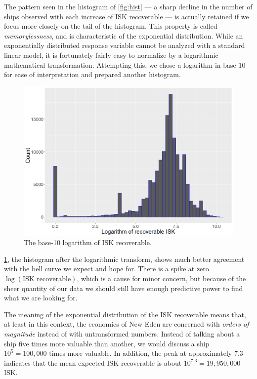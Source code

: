 \documentclass[letterpaper,12pt,article]{memoir}
\begin{document}
The pattern seen in the histogram of \cref{fig:hist} --- a sharp decline in the
number of ships observed with each increase of ISK recoverable --- is actually
retained if we focus more closely on the tail of the histogram. This property is
called \textit{memorylessness}, and is characteristic of the exponential 
distribution. While an exponentially distributed response variable cannot be
analyzed with a standard linear model, it is fortunately fairly easy to normalize
by a logarithmic mathematical transformation. Attempting this, we chose a logarithm
in base 10 for ease of interpretation and prepared another histogram.

\begin{figure}[ht]
    \centering
    \includegraphics[width=4.5in]{Hist_LogRecoverable.png}
    \caption{The base-10 logarithm of ISK recoverable.}
    \label{fig:loghist}
\end{figure}

\cref{fig:loghist}, the histogram after the logarithmic transform, shows much
better agreement with the bell curve we expect and hope for. There is a spike at
zero $\log{(\textrm{ISK recoverable})}$, which is a cause for minor concern, but
because of the sheer quantity of our data we should still have enough predictive
power to find what we are looking for.

The meaning of the exponential distribution of the ISK recoverable means that, at
least in this context, the economics of New Eden are concerned with \textit{orders
of magnitude} instead of with untransformed numbers. Instead of talking about a
ship five times more valuable than another, we would discuss a ship $10^5 = 
100,000$ times more valuable. In addition, the peak at approximately 7.3 indicates
that the mean expected ISK recoverable is about $10^{7.3} = 19,950,000$ ISK.
\end{document}

